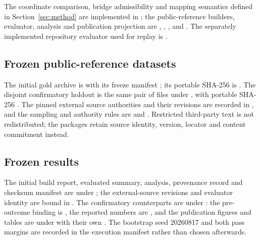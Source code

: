 The coordinate comparison, bridge admissibility and mapping semantics defined
in Section~\ref{sec:method} are implemented in
; the public-reference builders,
evaluator, analysis and publication projection are
,
,
,
 and
. The separately
implemented repository evaluator used for replay is
.

\subsection{Frozen public-reference datasets}

The initial gold archive is
 with
its freeze manifest
;
its portable SHA-256 is
. The
disjoint confirmatory holdout is the same pair of files under
, with portable
SHA-256
. The
pinned external source authorities and their revisions are recorded in
, and the sampling and
authority rules are  and
. Restricted third-party text is not
redistributed; the packages retain source identity, version, locator and
content commitment instead.

\subsection{Frozen results}

The initial build report, evaluated summary, analysis, provenance record and
checksum manifest are under ; the
external-source revisions and evaluator identity are bound in
. The confirmatory
counterparts are under : the
pre-outcome binding is , the reported numbers are
, and the publication figures and tables are
under  with their own . The bootstrap seed
20260817 and both pass margins are recorded in the execution manifest rather
than chosen afterwards.

